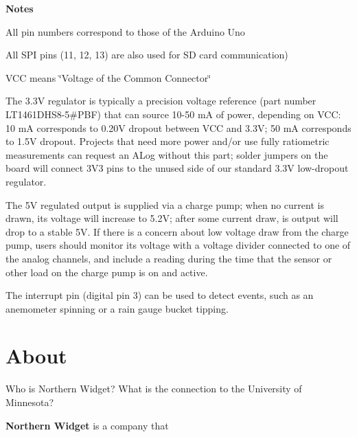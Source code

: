 {\bfseries Notes} 
\begin{DoxyEnumerate}
\item All pin numbers correspond to those of the Arduino Uno
\item All S\+PI pins (11, 12, 13) are also used for SD card communication)
\item V\+CC means \char`\"{}\+Voltage of the Common Connector\char`\"{}
\item The 3.\+3V regulator is typically a precision voltage reference (part number L\+T1461\+D\+H\+S8-\/5\#\+P\+BF) that can source 10-\/50 mA of power, depending on V\+CC\+: 10 mA corresponds to 0.\+20V dropout between V\+CC and 3.\+3V; 50 mA corresponds to 1.\+5V dropout. Projects that need more power and/or use fully ratiometric measurements can request an A\+Log without this part; solder jumpers on the board will connect 3\+V3 pins to the unused side of our standard 3.\+3V low-\/dropout regulator.
\item The 5V regulated output is supplied via a charge pump; when no current is drawn, its voltage will increase to 5.\+2V; after some current draw, is output will drop to a stable 5V. If there is a concern about low voltage draw from the charge pump, users should monitor its voltage with a voltage divider connected to one of the analog channels, and include a reading during the time that the sensor or other load on the charge pump is on and active.
\item The interrupt pin (digital pin 3) can be used to detect events, such as an anemometer spinning or a rain gauge bucket tipping.
\end{DoxyEnumerate}\hypertarget{index_About}{}\section{About}\label{index_About}
Who is Northern Widget? What is the connection to the University of Minnesota?

{\bfseries Northern Widget} is a company that 